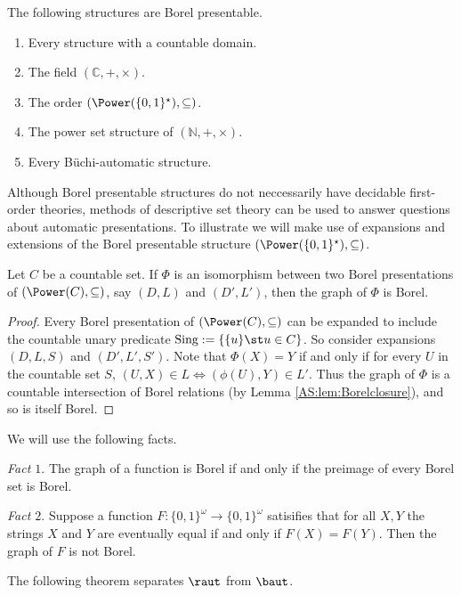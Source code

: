 \begin{example} The following structures are Borel presentable.
 \begin{enumerate}
  \item Every structure with a countable domain.
  \item The field $(\mathbb{C},+,\times)$.
  \item The order $(\Power(\{0,1\}^\star),\subseteq)$.
  \item The power set structure of $(\mathbb{N},+,\times)$.
  \item Every  B\"uchi-automatic structure.
 \end{enumerate}
\end{example}

Although Borel presentable structures do not neccessarily have decidable first-order theories, methods of descriptive set theory can
be used to answer questions about automatic presentations. To illustrate we will make use of expansions and extensions of the Borel presentable
structure $(\Power(\{0,1\}^\star),\subseteq)$.

\begin{lemma}  \label{AS:lem:borel}
Let $C$ be a countable set.
If $\Phi$ is an isomorphism between two Borel presentations of $(\Power(C),\subseteq)$, say $(D,L)$ and $(D',L')$, 
then the graph of $\Phi$ is Borel.
\end{lemma}

\begin{proof}
Every Borel presentation of  $(\Power(C),\subseteq)$ can be expanded to include the countable unary predicate $\text{Sing} := \{\{u\} \st u \in C\}$.
So consider expansions $(D,L,S)$ and $(D',L',S')$. 
Note that $\Phi(X)=Y$ if and only if for every $U$ in the countable set $S$, $(U,X) \in L \iff (\phi(U),Y) \in L'$. Thus the graph of $\Phi$ is a countable intersection of Borel relations (by Lemma \ref{AS:lem:Borelclosure}), and so is itself Borel.
\end{proof}

We will use the following facts. 

{\em Fact $1.$} The graph of a function is Borel if and only if the preimage of every Borel set is Borel.

{\em Fact $2.$}  Suppose a function $F:\{0,1\}^\omega \to \{0,1\}^\omega$ satisifies that for all $X,Y$ 
the strings $X$ and $Y$ are eventually equal if and only if $F(X) = F(Y)$. Then the graph of $F$ is not Borel.

The following theorem separates $\raut$ from $\baut$.

